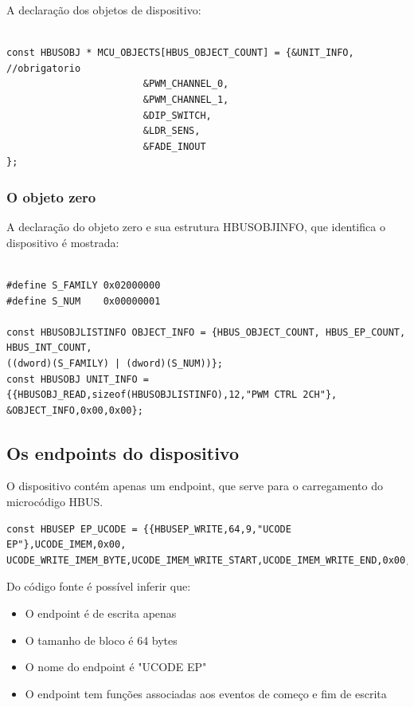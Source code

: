 \documentclass[11pt]{report}
\begin{document}
A declaração dos objetos de dispositivo:

\begin{verbatim}

const HBUSOBJ * MCU_OBJECTS[HBUS_OBJECT_COUNT] = {&UNIT_INFO, //obrigatorio
						&PWM_CHANNEL_0,
						&PWM_CHANNEL_1,
						&DIP_SWITCH,
						&LDR_SENS,
						&FADE_INOUT
};

\end{verbatim}

\subsubsection{O objeto zero}

A declaração do objeto zero e sua estrutura HBUSOBJINFO, que identifica o dispositivo é mostrada:

\begin{verbatim}

#define S_FAMILY 0x02000000
#define S_NUM    0x00000001

const HBUSOBJLISTINFO OBJECT_INFO = {HBUS_OBJECT_COUNT, HBUS_EP_COUNT, HBUS_INT_COUNT, 
((dword)(S_FAMILY) | (dword)(S_NUM))};
const HBUSOBJ UNIT_INFO = {{HBUSOBJ_READ,sizeof(HBUSOBJLISTINFO),12,"PWM CTRL 2CH"},
&OBJECT_INFO,0x00,0x00};

\end{verbatim}

\subsection{Os endpoints do dispositivo}

O dispositivo contém apenas um endpoint, que serve para o carregamento do microcódigo HBUS.

\begin{verbatim}
const HBUSEP EP_UCODE = {{HBUSEP_WRITE,64,9,"UCODE EP"},UCODE_IMEM,0x00,
UCODE_WRITE_IMEM_BYTE,UCODE_IMEM_WRITE_START,UCODE_IMEM_WRITE_END,0x00,0x00};
\end{verbatim}

Do código fonte é possível inferir que:

\begin{itemize}

\item O endpoint é de escrita apenas
\item O tamanho de bloco é 64 bytes
\item O nome do endpoint é "UCODE EP"
\item O endpoint tem funções associadas aos eventos de começo e fim de escrita

\end{itemize}
\end{document}
